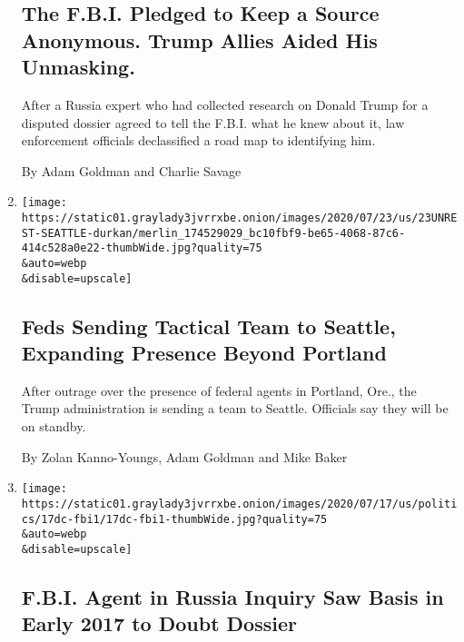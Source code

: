 \begin{enumerate}
  \hypertarget{the-fbi-pledged-to-keep-a-source-anonymous-trump-allies-aided-his-unmasking}{%
  \subsection{The F.B.I. Pledged to Keep a Source Anonymous. Trump
  Allies Aided His
  Unmasking.}\label{the-fbi-pledged-to-keep-a-source-anonymous-trump-allies-aided-his-unmasking}}

  After a Russia expert who had collected research on Donald Trump for a
  disputed dossier agreed to tell the F.B.I. what he knew about it, law
  enforcement officials declassified a road map to identifying him.

  By Adam Goldman and Charlie Savage
\item
  \href{/2020/07/23/us/seattle-protests-feds.html}{}

  \texttt{[image: https://static01.graylady3jvrrxbe.onion/images/2020/07/23/us/23UNREST-SEATTLE-durkan/merlin\_174529029\_bc10fbf9-be65-4068-87c6-414c528a0e22-thumbWide.jpg?quality=75\\\&auto=webp\\\&disable=upscale]}

  \hypertarget{feds-sending-tactical-team-to-seattle-expanding-presence-beyond-portland}{%
  \subsection{Feds Sending Tactical Team to Seattle, Expanding Presence
  Beyond
  Portland}\label{feds-sending-tactical-team-to-seattle-expanding-presence-beyond-portland}}

  After outrage over the presence of federal agents in Portland, Ore.,
  the Trump administration is sending a team to Seattle. Officials say
  they will be on standby.

  By Zolan Kanno-Youngs, Adam Goldman and Mike Baker
\item
  \href{/2020/07/17/us/politics/steele-dossier-peter-strzok.html}{}

  \texttt{[image: https://static01.graylady3jvrrxbe.onion/images/2020/07/17/us/politics/17dc-fbi1/17dc-fbi1-thumbWide.jpg?quality=75\\\&auto=webp\\\&disable=upscale]}

  \hypertarget{fbi-agent-in-russia-inquiry-saw-basis-in-early-2017-to-doubt-dossier}{%
  \subsection{F.B.I. Agent in Russia Inquiry Saw Basis in Early 2017 to
  Doubt
  Dossier}\label{fbi-agent-in-russia-inquiry-saw-basis-in-early-2017-to-doubt-dossier}}


\end{enumerate}
